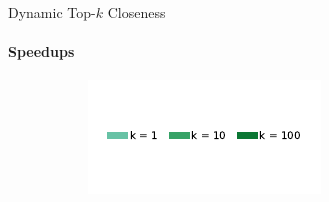 \documentclass[10pt,titlepage,english,presentation]{beamer}
\begin{document}
\begin{frame}[t]{Dynamic Top-$k$ Closeness}
\framesubtitle{Speedups}\vspace{-1cm}

\begin{figure}
\centering
\begin{subfigure}[t]{\textwidth}
\centering
\includegraphics{../sources/plots/dyn-topk/legend-speedup.pdf}
\end{subfigure}\vspace{-1cm}


\end{figure}
\end{frame}
\end{document}
